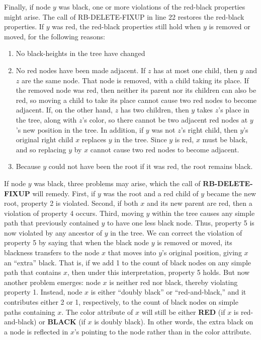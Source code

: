 \documentclass{report}
\begin{document}
\bigbreak \noindent 
Finally, if node $y$ was black, one or more violations of the red-black properties
might arise. The call of RB-DELETE-FIXUP in line 22 restores the red-black
properties. If $y$ was red, the red-black properties still hold when $y$ is removed
or moved, for the following reasons:
\begin{enumerate}
    \item No black-heights in the tree have changed
    \item No red nodes have been made adjacent. If \(z\) has at most one child, then \(y\) and \(z\) are the same node. That node is removed, with a child taking its place. If the removed node was red, then neither its parent nor its children can also be red, so moving a child to take its place cannot cause two red nodes to become adjacent. If, on the other hand, \(z\) has two children, then \(y\) takes \(z\)'s place in the tree, along with \(z\)'s color, so there cannot be two adjacent red nodes at \(y\)'s new position in the tree. In addition, if \(y\) was not \(z\)'s right child, then \(y\)'s original right child \(x\) replaces \(y\) in the tree. Since \(y\) is red, \(x\) must be black, and so replacing \(y\) by \(x\) cannot cause two red nodes to become adjacent.
    \item Because \(y\) could not have been the root if it was red, the root remains black.
\end{enumerate}
\bigbreak \noindent 
If node \(y\) was black, three problems may arise, which the call of \textbf{RB-DELETE-FIXUP} will remedy. First, if \(y\) was the root and a red child of \(y\) became the new root, property 2 is violated. Second, if both \(x\) and its new parent are red, then a violation of property 4 occurs. Third, moving \(y\) within the tree causes any simple path that previously contained \(y\) to have one less black node. Thus, property 5 is now violated by any ancestor of \(y\) in the tree. We can correct the violation of property 5 by saying that when the black node \(y\) is removed or moved, its blackness transfers to the node \(x\) that moves into \(y\)'s original position, giving \(x\) an “extra” black. That is, if we add 1 to the count of black nodes on any simple path that contains \(x\), then under this interpretation, property 5 holds. But now another problem emerges: node \(x\) is neither red nor black, thereby violating property 1. Instead, node \(x\) is either “doubly black” or “red-and-black,” and it contributes either 2 or 1, respectively, to the count of black nodes on simple paths containing \(x\). The color attribute of \(x\) will still be either \textbf{RED} (if \(x\) is red-and-black) or \textbf{BLACK} (if \(x\) is doubly black). In other words, the extra black on a node is reflected in \(x\)'s pointing to the node rather than in the color attribute.
\end{document}
